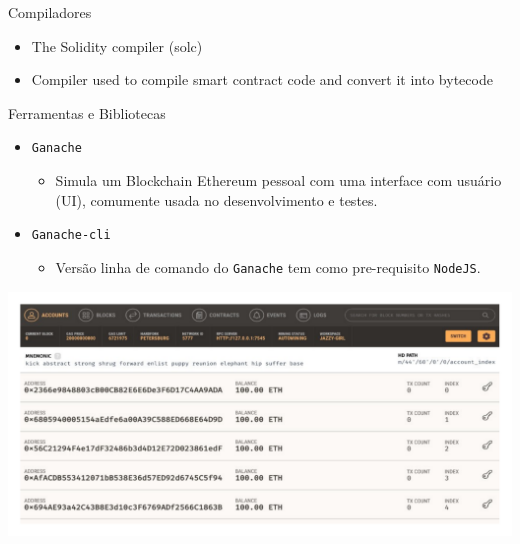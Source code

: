 \documentclass[
  pt-BR,
  ignorenonframetext,
]{beamer}
\providecommand{\tightlist}{%
  \setlength{\itemsep}{0pt}\setlength{\parskip}{0pt}}
\begin{document}
\begin{frame}[allowframebreaks]{Compiladores}
\protect\hypertarget{compiladores}{}
\begin{itemize}
\tightlist
\item
  The Solidity compiler (solc)
\item
  Compiler used to compile smart contract code and convert it into
  bytecode
\end{itemize}
\end{frame}

\begin{frame}{Ferramentas e Bibliotecas}
\protect\hypertarget{ferramentas-e-bibliotecas}{}
\begin{itemize}
\tightlist
\item
  \texttt{Ganache}

  \begin{itemize}
  \tightlist
  \item
    Simula um Blockchain Ethereum pessoal com uma interface com usuário
    (UI), comumente usada no desenvolvimento e testes.
  \end{itemize}
\item
  \texttt{Ganache-cli}

  \begin{itemize}
  \tightlist
  \item
    Versão linha de comando do \texttt{Ganache} tem como pre-requisito
    \texttt{NodeJS}.
  \end{itemize}
\end{itemize}

\includegraphics{figuras/ganache-interface.pdf}
\end{frame}
\end{document}
